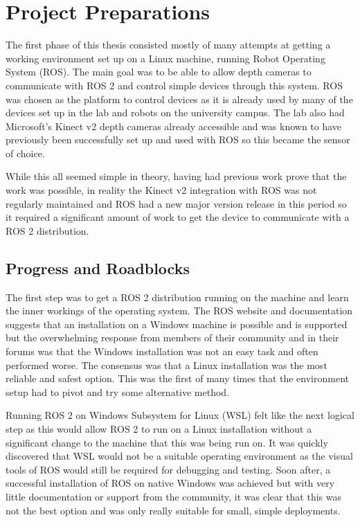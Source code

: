 \chapter{Project Preparations}\label{ch:project_prep}
The first phase of this thesis consisted mostly of many attempts at getting a working environment set up on a Linux machine, running Robot Operating System (ROS).
The main goal was to be able to allow depth cameras to communicate with ROS 2 and control simple devices through this system.
ROS was chosen as the platform to control devices as it is already used by many of the devices set up in the lab and robots on the university campus.
The lab also had Microsoft's Kinect v2 depth cameras already accessible and was known to have previously been successfully set up and used with ROS so this became the sensor of choice.

While this all seemed simple in theory, having had previous work prove that the work was possible, in reality the Kinect v2 integration with ROS was not regularly maintained and ROS had a new major version release in this period so it required a significant amount of work to get the device to communicate with a ROS 2 distribution.

\section{Progress and Roadblocks}

The first step was to get a ROS 2 distribution running on the machine and learn the inner workings of the operating system.
The ROS website and documentation suggests that an installation on a Windows machine is possible and is supported but the overwhelming response from members of their community and in their forums was that the Windows installation was not an easy task and often performed worse.
The consensus was that a Linux installation was the most reliable and safest option.
This was the first of many times that the environment setup had to pivot and try some alternative method.

Running ROS 2 on Windows Subsystem for Linux (WSL) felt like the next logical step as this would allow ROS 2 to run on a Linux installation without a significant change to the machine that this was being run on.
It was quickly discovered that WSL would not be a suitable operating environment as the visual tools of ROS would still be required for debugging and testing.
Soon after, a successful installation of ROS on native Windows was achieved but with very little documentation or support from the community, it was clear that this was not the best option and was only really suitable for small, simple deployments.

